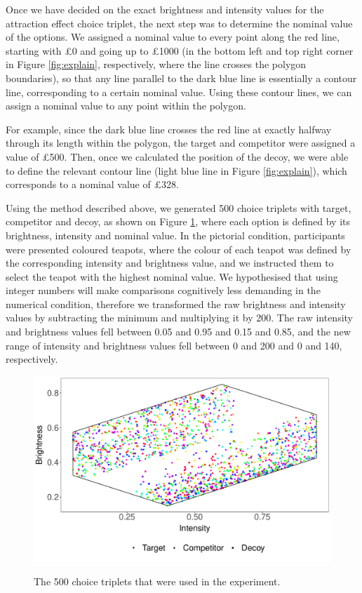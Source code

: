 \documentclass[11pt,a4paper]{article}
\begin{document}
Once we have decided on the exact brightness and intensity values for the attraction effect choice triplet, the next step was to determine the nominal value of the options. We assigned a nominal value to every point along the red line, starting with £0 and going up to £1000 (in the bottom left and top right corner in Figure \ref{fig:explain}, respectively, where the line crosses the polygon boundaries), so that any line parallel to the dark blue line is essentially a contour line, corresponding to a certain nominal value. Using these contour lines, we can assign a nominal value to any point within the polygon.

For example, since the dark blue line crosses the red line at exactly halfway through its length within the polygon, the target and competitor were assigned a value of £500. Then, once we calculated the position of the decoy, we were able to define the relevant contour line (light blue line in Figure \ref{fig:explain}), which corresponds to a nominal value of £328. 

Using the method described above, we generated 500 choice triplets with target, competitor and decoy, as shown on Figure \ref{fig:choice_sets}, where each option is defined by its brightness, intensity and nominal value. In the pictorial condition, participants were presented coloured teapots, where the colour of each teapot was defined by the corresponding intensity and brightness value, and we instructed them to select the teapot with the highest nominal value. We hypothesised that using integer numbers will make comparisons cognitively less demanding in the numerical condition, therefore we transformed the raw brightness and intensity values by subtracting the minimum and multiplying it by 200. The raw intensity and brightness values fell between 0.05 and 0.95 and 0.15 and 0.85, and the new range of intensity and brightness values fell between 0 and 200 and 0 and 140, respectively.


\begin{figure}
\centering
\caption{The 500 choice triplets that were used in the experiment.}
\includegraphics[width=1\textwidth]{AE_teapots_Figure_2poly.pdf}
\label{fig:choice_sets}
\end{figure}
\end{document}
